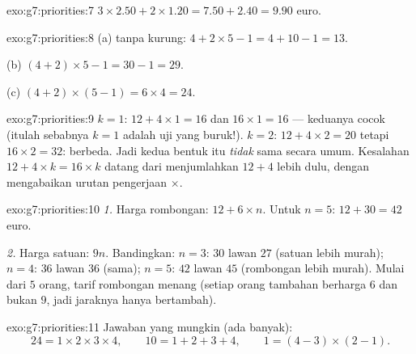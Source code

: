 \begin{solution}{exo:g7:priorities:7}
$3 \times 2.50 + 2 \times 1.20 = 7.50 + 2.40 = 9.90$ euro.
\end{solution}

\begin{solution}{exo:g7:priorities:8}
(a) tanpa kurung: $4 + 2 \times 5 - 1 = 4 + 10 - 1 = 13$.

(b) $(4 + 2) \times 5 - 1 = 30 - 1 = 29$.

(c) $(4 + 2) \times (5 - 1) = 6 \times 4 = 24$.
\end{solution}

\begin{solution}{exo:g7:priorities:9}
$k = 1$: $12 + 4 \times 1 = 16$ dan $16 \times 1 = 16$ --- keduanya
cocok (itulah sebabnya $k = 1$ adalah uji yang buruk!). $k = 2$:
$12 + 4 \times 2 = 20$ tetapi $16 \times 2 = 32$: berbeda. Jadi kedua
bentuk itu \emph{tidak} sama secara umum. Kesalahan
$12 + 4 \times k = 16 \times k$ datang dari menjumlahkan $12 + 4$
lebih dulu, dengan mengabaikan urutan pengerjaan $\times$.
\end{solution}

\begin{solution}{exo:g7:priorities:10}
\emph{1.} Harga rombongan: $12 + 6 \times n$. Untuk $n = 5$:
$12 + 30 = 42$ euro.

\emph{2.} Harga satuan: $9n$. Bandingkan: $n = 3$: $30$ lawan $27$
(satuan lebih murah); $n = 4$: $36$ lawan $36$ (sama); $n = 5$: $42$
lawan $45$ (rombongan lebih murah). Mulai dari $5$ orang, tarif
rombongan menang (setiap orang tambahan berharga $6$ dan bukan $9$,
jadi jaraknya hanya bertambah).
\end{solution}

\begin{solution}{exo:g7:priorities:11}
Jawaban yang mungkin (ada banyak):
\[
24 = 1 \times 2 \times 3 \times 4, \qquad
10 = 1 + 2 + 3 + 4, \qquad
1 = (4 - 3) \times (2 - 1).
\]
\end{solution}

